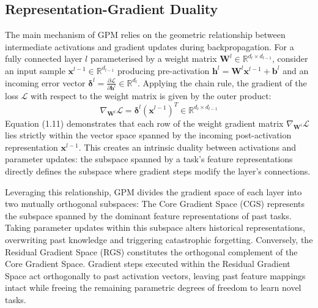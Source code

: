 \documentclass[11pt,oneside]{report}
\begin{document}
\subsection{Representation-Gradient Duality}
The main mechanism of GPM relies on the geometric relationship between intermediate activations and gradient updates during backpropagation. For a fully connected layer $l$ parameterised by a weight matrix $\mathbf{W}^l \in \mathbb{R}^{d_l \times d_{l-1}}$, consider an input sample $\mathbf{x}^{l-1} \in \mathbb{R}^{d_{l-1}}$ producing pre-activation $\mathbf{h}^l = \mathbf{W}^l \mathbf{x}^{l-1} + \mathbf{b}^l$ and an incoming error vector $\boldsymbol{\delta}^l = \frac{\partial \mathcal{L}}{\partial \mathbf{h}^l} \in \mathbb{R}^{d_l}$. Applying the chain rule, the gradient of the loss $\mathcal{L}$ with respect to the weight matrix is given by the outer product:
\begin{equation}
	\nabla_{\mathbf{W}^l} \mathcal{L} = \boldsymbol{\delta}^l (\mathbf{x}^{l-1})^T \in \mathbb{R}^{d_l \times d_{l-1}}
\end{equation}
Equation (1.11) demonstrates that each row of the weight gradient matrix $\nabla_{\mathbf{W}^l} \mathcal{L}$ lies strictly within the vector space spanned by the incoming post-activation representation $\mathbf{x}^{l-1}$. This creates an intrinsic duality between activations and parameter updates: the subspace spanned by a task's feature representations directly defines the subspace where gradient steps modify the layer's connections. 

Leveraging this relationship, GPM divides the gradient space of each layer into two mutually orthogonal subspaces:
The Core Gradient Space (CGS) represents the subspace spanned by the dominant feature representations of past tasks. Taking parameter updates within this subspace alters historical representations, overwriting past knowledge and triggering catastrophic forgetting. Conversely, the Residual Gradient Space (RGS) constitutes the orthogonal complement of the Core Gradient Space. Gradient steps executed within the Residual Gradient Space act orthogonally to past activation vectors, leaving past feature mappings intact while freeing the remaining parametric degrees of freedom to learn novel tasks.
\end{document}
